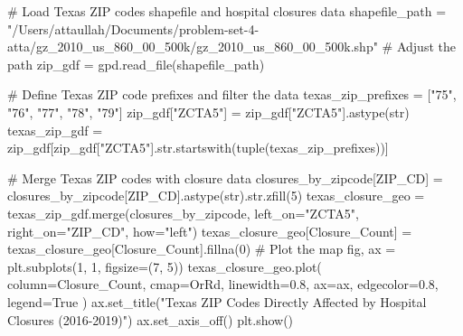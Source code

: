 \documentclass[
  letterpaper,
  DIV=11,
  numbers=noendperiod]{scrartcl}
\newenvironment{Shaded}{\begin{snugshade}}{\end{snugshade}}
\newcommand{\BuiltInTok}[1]{\textcolor[rgb]{0.00,0.23,0.31}{#1}}
\newcommand{\CommentTok}[1]{\textcolor[rgb]{0.37,0.37,0.37}{#1}}
\newcommand{\DecValTok}[1]{\textcolor[rgb]{0.68,0.00,0.00}{#1}}
\newcommand{\FloatTok}[1]{\textcolor[rgb]{0.68,0.00,0.00}{#1}}
\newcommand{\NormalTok}[1]{\textcolor[rgb]{0.00,0.23,0.31}{#1}}
\newcommand{\OperatorTok}[1]{\textcolor[rgb]{0.37,0.37,0.37}{#1}}
\newcommand{\StringTok}[1]{\textcolor[rgb]{0.13,0.47,0.30}{#1}}
\newcommand{\VariableTok}[1]{\textcolor[rgb]{0.07,0.07,0.07}{#1}}
\begin{document}
\begin{Shaded}
\begin{Highlighting}[]
\CommentTok{\# Load Texas ZIP codes shapefile and hospital closures data}
\NormalTok{shapefile\_path }\OperatorTok{=} \StringTok{"/Users/attaullah/Documents/problem{-}set{-}4{-}atta/gz\_2010\_us\_860\_00\_500k/gz\_2010\_us\_860\_00\_500k.shp"}  \CommentTok{\# Adjust the path}
\NormalTok{zip\_gdf }\OperatorTok{=}\NormalTok{ gpd.read\_file(shapefile\_path)}

\CommentTok{\# Define Texas ZIP code prefixes and filter the data}
\NormalTok{texas\_zip\_prefixes }\OperatorTok{=}\NormalTok{ [}\StringTok{"75"}\NormalTok{, }\StringTok{"76"}\NormalTok{, }\StringTok{"77"}\NormalTok{, }\StringTok{"78"}\NormalTok{, }\StringTok{"79"}\NormalTok{]}
\NormalTok{zip\_gdf[}\StringTok{"ZCTA5"}\NormalTok{] }\OperatorTok{=}\NormalTok{ zip\_gdf[}\StringTok{"ZCTA5"}\NormalTok{].astype(}\BuiltInTok{str}\NormalTok{)}
\NormalTok{texas\_zip\_gdf }\OperatorTok{=}\NormalTok{ zip\_gdf[zip\_gdf[}\StringTok{"ZCTA5"}\NormalTok{].}\BuiltInTok{str}\NormalTok{.startswith(}\BuiltInTok{tuple}\NormalTok{(texas\_zip\_prefixes))]}

\CommentTok{\# Merge Texas ZIP codes with closure data}
\NormalTok{closures\_by\_zipcode[}\StringTok{\textquotesingle{}ZIP\_CD\textquotesingle{}}\NormalTok{] }\OperatorTok{=}\NormalTok{ closures\_by\_zipcode[}\StringTok{\textquotesingle{}ZIP\_CD\textquotesingle{}}\NormalTok{].astype(}\BuiltInTok{str}\NormalTok{).}\BuiltInTok{str}\NormalTok{.zfill(}\DecValTok{5}\NormalTok{)}
\NormalTok{texas\_closure\_geo }\OperatorTok{=}\NormalTok{ texas\_zip\_gdf.merge(closures\_by\_zipcode, left\_on}\OperatorTok{=}\StringTok{"ZCTA5"}\NormalTok{, right\_on}\OperatorTok{=}\StringTok{"ZIP\_CD"}\NormalTok{, how}\OperatorTok{=}\StringTok{"left"}\NormalTok{)}
\NormalTok{texas\_closure\_geo[}\StringTok{\textquotesingle{}Closure\_Count\textquotesingle{}}\NormalTok{] }\OperatorTok{=}\NormalTok{ texas\_closure\_geo[}\StringTok{\textquotesingle{}Closure\_Count\textquotesingle{}}\NormalTok{].fillna(}\DecValTok{0}\NormalTok{)}
\CommentTok{\# Plot the map}
\NormalTok{fig, ax }\OperatorTok{=}\NormalTok{ plt.subplots(}\DecValTok{1}\NormalTok{, }\DecValTok{1}\NormalTok{, figsize}\OperatorTok{=}\NormalTok{(}\DecValTok{7}\NormalTok{, }\DecValTok{5}\NormalTok{))}
\NormalTok{texas\_closure\_geo.plot(}
\NormalTok{    column}\OperatorTok{=}\StringTok{\textquotesingle{}Closure\_Count\textquotesingle{}}\NormalTok{,}
\NormalTok{    cmap}\OperatorTok{=}\StringTok{\textquotesingle{}OrRd\textquotesingle{}}\NormalTok{,}
\NormalTok{    linewidth}\OperatorTok{=}\FloatTok{0.8}\NormalTok{,}
\NormalTok{    ax}\OperatorTok{=}\NormalTok{ax,}
\NormalTok{    edgecolor}\OperatorTok{=}\StringTok{\textquotesingle{}0.8\textquotesingle{}}\NormalTok{,}
\NormalTok{    legend}\OperatorTok{=}\VariableTok{True}
\NormalTok{)}
\NormalTok{ax.set\_title(}\StringTok{"Texas ZIP Codes Directly Affected by Hospital Closures (2016{-}2019)"}\NormalTok{)}
\NormalTok{ax.set\_axis\_off()}
\NormalTok{plt.show()}
\end{Highlighting}
\end{Shaded}
\end{document}
